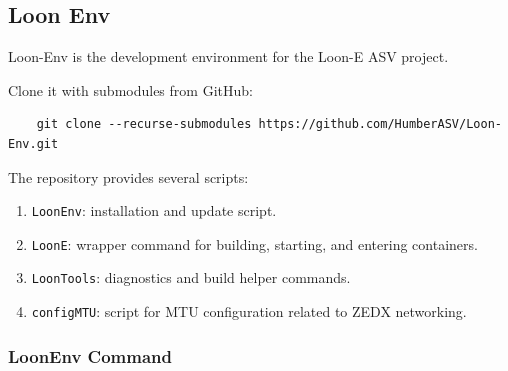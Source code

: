 %
%
%
%

\subsection{Loon Env}
\label{sec:loon-env}

Loon-Env is the development environment for the Loon-E ASV project.

Clone it with submodules from GitHub:

\begin{verbatim}
    git clone --recurse-submodules https://github.com/HumberASV/Loon-Env.git
\end{verbatim}


The repository provides several scripts:

\begin{enumerate}
 \item \texttt{LoonEnv}: installation and update script.
 \item \texttt{LoonE}: wrapper command for building, starting, and entering containers.
 \item \texttt{LoonTools}: diagnostics and build helper commands.
 \item \texttt{configMTU}: script for MTU configuration related to ZEDX networking.
\end{enumerate}

\subsubsection{LoonEnv Command}

